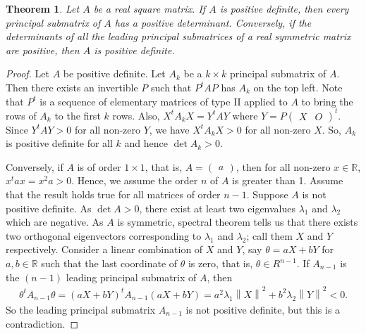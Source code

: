 \documentclass[15pt,a4paper]{book}
\newtheorem{theorem}{Theorem}[chapter]
\theoremstyle{definition}
\newcommand{\R}{\mathbb{R}}
\newcommand{\norm}[1]{\left\lVert#1\right\rVert}
\begin{document}
\begin{theorem}
    Let $A$ be a real square matrix. If $A$ is positive definite, then every principal submatrix of $A$ has a positive determinant. Conversely, if the determinants of all the leading principal submatrices of a real symmetric matrix are positive, then $A$ is positive definite.
\end{theorem}
\begin{proof}
    Let $A$ be positive definite. Let $A_{k}$ be a $k \times k$ principal submatrix of $A$. Then there exists an invertible $P$ such that $P^{t}AP$ has $A_{k}$ on the top left. Note that $P^{t}$ is a sequence of elementary matrices of type II applied to $A$ to bring the rows of $A_{k}$ to the first $k$ rows. Also, $X^{t}A_{k}X = Y^{t}AY$ where $Y = P\begin{pmatrix}
        X & O
    \end{pmatrix}^{t}$. Since $Y^{t}AY > 0$ for all non-zero $Y$, we have $X^{t}A_{k}X > 0$ for all non-zero $X$. So, $A_{k}$ is positive definite for all $k$ and hence $\det A_{k} > 0$.

    Conversely, if $A$ is of order $1 \times 1$, that is, $A = \begin{pmatrix}
        a
    \end{pmatrix}$, then for all non-zero $x \in \R$, $x^{t}ax = x^{2}a > 0$. Hence, we assume the order $n$ of $A$ is greater than 1. Assume that the result holds true for all matrices of order $n-1$. Suppose $A$ is not positive definite. As $\det A > 0$, there exist at least two eigenvalues $\lambda_{1}$ and $\lambda_{2}$ which are negative. As $A$ is symmetric, spectral theorem tells us that there exists two orthogonal eigenvectors corresponding to $\lambda_{1}$ and $\lambda_{2}$; call them $X$ and $Y$ respectively. Consider a linear combination of $X$ and $Y$, say $\theta = aX + bY$ for $a,b \in \R$ such that the last coordinate of $\theta$ is zero, that is, $\theta \in R^{n-1}$. If $A_{n-1}$ is the $(n-1)$ leading principal submatrix of $A$, then
    \begin{align}
        \theta^{t}A_{n-1}\theta = (aX+bY)^{t}A_{n-1}(aX+bY) = a^{2}\lambda_{1} \norm{X}^{2} + b^{2}\lambda_{2}\norm{Y}^{2} < 0.
    \end{align}
    So the leading principal submatrix $A_{n-1}$ is not positive definite, but this is a contradiction.
\end{proof}
\end{document}
